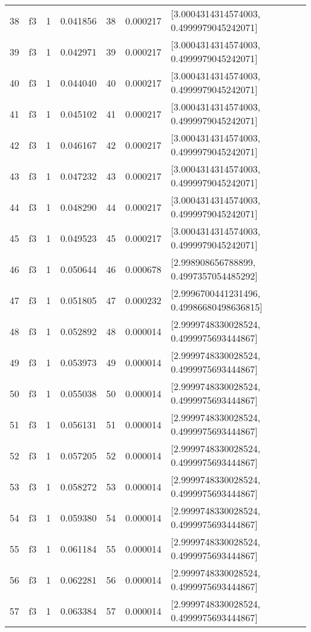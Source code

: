 \begin{tabular}{lllrlrl}
38  &  f3 &   1 &  0.041856 &   38 &  0.000217 &   [3.0004314314574003, 0.4999979045242071] \\
39  &  f3 &   1 &  0.042971 &   39 &  0.000217 &   [3.0004314314574003, 0.4999979045242071] \\
40  &  f3 &   1 &  0.044040 &   40 &  0.000217 &   [3.0004314314574003, 0.4999979045242071] \\
41  &  f3 &   1 &  0.045102 &   41 &  0.000217 &   [3.0004314314574003, 0.4999979045242071] \\
42  &  f3 &   1 &  0.046167 &   42 &  0.000217 &   [3.0004314314574003, 0.4999979045242071] \\
43  &  f3 &   1 &  0.047232 &   43 &  0.000217 &   [3.0004314314574003, 0.4999979045242071] \\
44  &  f3 &   1 &  0.048290 &   44 &  0.000217 &   [3.0004314314574003, 0.4999979045242071] \\
45  &  f3 &   1 &  0.049523 &   45 &  0.000217 &   [3.0004314314574003, 0.4999979045242071] \\
46  &  f3 &   1 &  0.050644 &   46 &  0.000678 &    [2.998908656788899, 0.4997357054485292] \\
47  &  f3 &   1 &  0.051805 &   47 &  0.000232 &  [2.9996700441231496, 0.49986680498636815] \\
48  &  f3 &   1 &  0.052892 &   48 &  0.000014 &   [2.9999748330028524, 0.4999975693444867] \\
49  &  f3 &   1 &  0.053973 &   49 &  0.000014 &   [2.9999748330028524, 0.4999975693444867] \\
50  &  f3 &   1 &  0.055038 &   50 &  0.000014 &   [2.9999748330028524, 0.4999975693444867] \\
51  &  f3 &   1 &  0.056131 &   51 &  0.000014 &   [2.9999748330028524, 0.4999975693444867] \\
52  &  f3 &   1 &  0.057205 &   52 &  0.000014 &   [2.9999748330028524, 0.4999975693444867] \\
53  &  f3 &   1 &  0.058272 &   53 &  0.000014 &   [2.9999748330028524, 0.4999975693444867] \\
54  &  f3 &   1 &  0.059380 &   54 &  0.000014 &   [2.9999748330028524, 0.4999975693444867] \\
55  &  f3 &   1 &  0.061184 &   55 &  0.000014 &   [2.9999748330028524, 0.4999975693444867] \\
56  &  f3 &   1 &  0.062281 &   56 &  0.000014 &   [2.9999748330028524, 0.4999975693444867] \\
57  &  f3 &   1 &  0.063384 &   57 &  0.000014 &   [2.9999748330028524, 0.4999975693444867] \\

\end{tabular}
